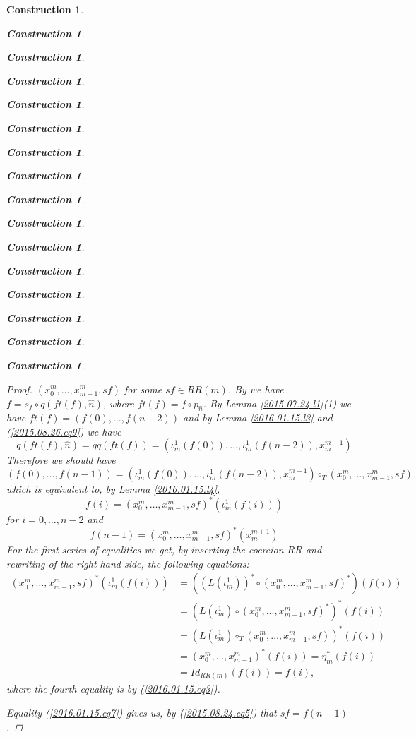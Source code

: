 \documentclass[12pt]{amsart}
\numberwithin{proposition}{subsection}
\newtheorem{construction}[proposition]{Construction}
\newcommand{\llabel}[1]{\label{#1}}
\newcommand{\wh}{\widehat}
\newcommand{\mbind}[1]{{#1^*}}
\newcommand{\hc}{\circ_{T}}
\begin{document}
\begin{construction}
\begin{construction}
\begin{construction}
\begin{construction}
\begin{construction}
\begin{construction}
\begin{construction}
\begin{construction}
\begin{construction}
\begin{construction}
\begin{construction}
\begin{construction}
\begin{construction}
\begin{construction}
\begin{construction}
\begin{construction}
\begin{proof}
$(x_0^m,\dots,x_{m-1}^m,sf)$ for some $sf\in RR(m)$. By \cite[Definition
  2.3(3)]{Csubsystems} we have $f=s_f\circ q(ft(f),\wh{n})$, where $ft(f)=f\circ
p_{\wh{n}}$. By Lemma \ref{2015.07.24.l1}(1) we have
$ft(f)=(f(0),\dots,f(n-2))$ and by Lemma \ref{2016.01.15.l3} and
(\ref{2015.08.26.eq9}) we have
%
$$q(ft(f),\wh{n})=qq(ft(f))=(\iota_m^1(f(0)),\dots,\iota_m^1(f(n-2)),x_{m}^{m+1})$$
%
Therefore we should have
%
$$(f(0),\dots,f(n-1))=(\iota_m^1(f(0)),\dots,\iota_m^1(f(n-2)),x_{m}^{m+1})\hc (x_0^m,\dots,x_{m-1}^m,sf)$$
%
which is equivalent to, by Lemma \ref{2016.01.15.l4}, 
%
\begin{equation}\llabel{2016.01.15.eq6}
f(i)=\mbind{(x_0^m,\dots,x_{m-1}^m,sf)}(\iota_m^1(f(i)))
\end{equation}%
%
for $i=0,\dots,n-2$ and 
%
\begin{equation}\llabel{2016.01.15.eq7}
f(n-1)=\mbind{(x_0^m,\dots,x_{m-1}^m,sf)}(x_{m}^{m+1})
\end{equation}%
%
For the first series of equalities we get, by inserting the coercion $RR$ and
rewriting of the right hand side, the following equations:
%
\begin{equation*}
  \begin{split}
    \mbind{(x_0^m,\dots,x_{m-1}^m,sf)}(\iota_m^1(f(i)))
    &=
    (\mbind{(L(\iota_m^1))}\circ \mbind{(x_0^m,\dots,x_{m-1}^m,sf)})(f(i))
    \\&=
    \mbind{(L(\iota_m^1)\circ \mbind{(x_0^m,\dots,x_{m-1}^m,sf)})}(f(i))
    \\&=
    \mbind{(L(\iota_m^1)\hc (x_0^m,\dots,x_{m-1}^m,sf))}(f(i))
    \\&=
    \mbind{(x_0^m,\dots,x_{m-1}^m)}(f(i))=\mbind{\eta_{m}}(f(i))
    \\&=
    Id_{RR(m)}(f(i))=f(i),
  \end{split}
\end{equation*}
%
where the fourth equality is by (\ref{2016.01.15.eq3}). 

Equality (\ref{2016.01.15.eq7}) gives us, by (\ref{2015.08.24.eq5}) that $sf=f(n-1)$.
\end{proof}
%
%


\end{construction}
\end{construction}
\end{construction}
\end{construction}
\end{construction}
\end{construction}
\end{construction}
\end{construction}
\end{construction}
\end{construction}
\end{construction}
\end{construction}
\end{construction}
\end{construction}
\end{construction}
\end{construction}
\end{document}
